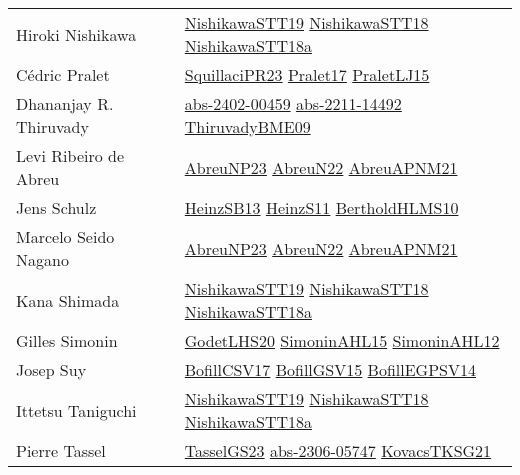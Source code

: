 {\begin{longtable}{p{4cm}p{20cm}}
Hiroki Nishikawa & \href{}{NishikawaSTT19}\cite{NishikawaSTT19} \href{papers/NishikawaSTT18.pdf}{NishikawaSTT18}\cite{NishikawaSTT18} \href{papers/NishikawaSTT18a.pdf}{NishikawaSTT18a}\cite{NishikawaSTT18a} \\
C{\'{e}}dric Pralet & \href{papers/SquillaciPR23.pdf}{SquillaciPR23}\cite{SquillaciPR23} \href{papers/Pralet17.pdf}{Pralet17}\cite{Pralet17} \href{papers/PraletLJ15.pdf}{PraletLJ15}\cite{PraletLJ15} \\
Dhananjay R. Thiruvady & \href{articles/abs-2402-00459.pdf}{abs-2402-00459}\cite{abs-2402-00459} \href{articles/abs-2211-14492.pdf}{abs-2211-14492}\cite{abs-2211-14492} \href{papers/ThiruvadyBME09.pdf}{ThiruvadyBME09}\cite{ThiruvadyBME09} \\
Levi Ribeiro de Abreu & \href{}{AbreuNP23}\cite{AbreuNP23} \href{articles/AbreuN22.pdf}{AbreuN22}\cite{AbreuN22} \href{}{AbreuAPNM21}\cite{AbreuAPNM21} \\
Jens Schulz & \href{articles/HeinzSB13.pdf}{HeinzSB13}\cite{HeinzSB13} \href{papers/HeinzS11.pdf}{HeinzS11}\cite{HeinzS11} \href{papers/BertholdHLMS10.pdf}{BertholdHLMS10}\cite{BertholdHLMS10} \\
Marcelo Seido Nagano & \href{}{AbreuNP23}\cite{AbreuNP23} \href{articles/AbreuN22.pdf}{AbreuN22}\cite{AbreuN22} \href{}{AbreuAPNM21}\cite{AbreuAPNM21} \\
Kana Shimada & \href{}{NishikawaSTT19}\cite{NishikawaSTT19} \href{papers/NishikawaSTT18.pdf}{NishikawaSTT18}\cite{NishikawaSTT18} \href{papers/NishikawaSTT18a.pdf}{NishikawaSTT18a}\cite{NishikawaSTT18a} \\
Gilles Simonin & \href{papers/GodetLHS20.pdf}{GodetLHS20}\cite{GodetLHS20} \href{articles/SimoninAHL15.pdf}{SimoninAHL15}\cite{SimoninAHL15} \href{papers/SimoninAHL12.pdf}{SimoninAHL12}\cite{SimoninAHL12} \\
Josep Suy & \href{papers/BofillCSV17.pdf}{BofillCSV17}\cite{BofillCSV17} \href{papers/BofillGSV15.pdf}{BofillGSV15}\cite{BofillGSV15} \href{papers/BofillEGPSV14.pdf}{BofillEGPSV14}\cite{BofillEGPSV14} \\
Ittetsu Taniguchi & \href{}{NishikawaSTT19}\cite{NishikawaSTT19} \href{papers/NishikawaSTT18.pdf}{NishikawaSTT18}\cite{NishikawaSTT18} \href{papers/NishikawaSTT18a.pdf}{NishikawaSTT18a}\cite{NishikawaSTT18a} \\
Pierre Tassel & \href{papers/TasselGS23.pdf}{TasselGS23}\cite{TasselGS23} \href{articles/abs-2306-05747.pdf}{abs-2306-05747}\cite{abs-2306-05747} \href{papers/KovacsTKSG21.pdf}{KovacsTKSG21}\cite{KovacsTKSG21} \\

\end{longtable}}
